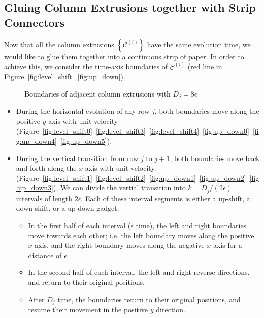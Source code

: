 \subsection{Gluing Column Extrusions together with Strip Connectors}
\label{sec:strip_connectors}

Now that all the column extrusions $\left\{ \mathcal C^{(i)} \right\}$ have the same evolution time,
we would like to glue them together into a continuous strip of paper.
In order to achieve this, we consider the time-axis boundaries of $\mathcal C^{(i)}$
(red line in Figure~\ref{fig:level_shift}~\ref{fig:up_down}).
\graphicspath{{./figures/}}
\begin{wrapfigure}{r}{0.35\textwidth}
    \def\svgwidth{0.35\textwidth}
    \caption{Boundaries of adjacent column extrusions with $D_j = 8\epsilon$}
    \label{fig:boundaries}
\end{wrapfigure}
\begin{itemize}
    \item During the horizontal evolution of any row $j$, both boundaries move along the positive $y$-axis with unit velocity
          (Figure~\ref{fig:level_shift0}~\ref{fig:level_shift3}~\ref{fig:level_shift4}~\ref{fig:up_down0}~\ref{fig:up_down4}~\ref{fig:up_down5}).
    \item During the vertical transition from row $j$ to $j+1$, both boundaries move back and forth along the $x$-axis with unit velocity.
          (Figure~\ref{fig:level_shift1}~\ref{fig:level_shift2}~\ref{fig:up_down1}~\ref{fig:up_down2}~\ref{fig:up_down3}).
          We can divide the vertial transition into $k = D_j/(2\epsilon)$ intervals of length $2\epsilon$.
          Each of these interval segments is either a up-shift, a down-shift, or a up-down gadget.
    \begin{itemize}
        \item In the first half of each interval ($\epsilon$ time), the left and right boundaries move towards each other;
              i.e. the left boundary moves along the positive $x$-axis, and the right boundary moves along the negative $x$-axis for a distance of $\epsilon$.
        \item In the second half of each interval, the left and right reverse directions, and return to their original positions.
        \item After $D_j$ time, the boundaries return to their original positions, and resume their movement in the positive $y$ direction.
    \end{itemize}
\end{itemize}

